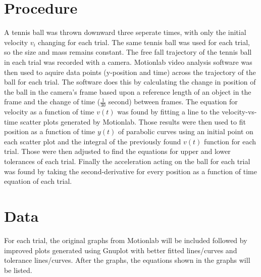 \documentclass[12pt,letterpaper]{article}
\begin{document}
\section{Procedure}
A tennis ball was thrown downward three seperate times, with only the initial velocity \(v_i\) changing for each trial. The same tennis ball was used for each trial, so the size and mass remains constant. The free fall trajectory of the tennis ball in each trial was recorded with a camera. Motionlab video analysis software was then used to aquire data points (y-position and time) across the trajectory of the ball for each trial. The software does this by calculating the change in position of the ball in the camera's frame based upon a reference length of an object in the frame and the change of time (\(\frac{1}{30}\) second) between frames. The equation for velocity as a function of time \(v(t)\) was found by fitting a line to the velocity-vs-time scatter plots generated by Motionlab. Those results were then used to fit position as a function of time \(y(t)\) of parabolic curves using an initial point on each scatter plot and the integral of the previously found \(v(t)\) function for each trial. Those were then adjusted to find the equations for upper and lower tolerances of each trial. Finally the acceleration acting on the ball for each trial was found by taking the second-derivative for every position as a function of time equation of each trial.
\section{Data}

For each trial, the original graphs from Motionlab will be included followed by improved plots generated using Gnuplot with better fitted lines/curves and tolerance lines/curves. After the graphs, the equations shown in the graphs will be listed.
\newline
\end{document}
